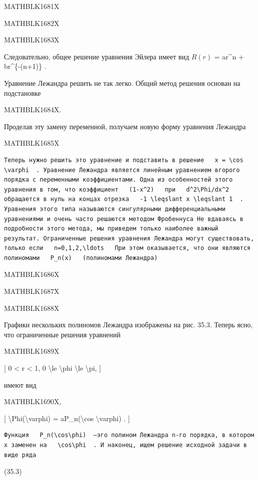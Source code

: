 \documentclass[
]{article}
\begin{document}
{{{MATHBLK1681X

MATHBLK1682X

MATHBLK1683X

Следовательно, общее решение уравнения Эйлера имеет вид \(R(r)\) =
ar\^{}n + br\^{}\{-(n+1)\} .

Уравнение Лежандра решить не так легко. Общий метод решения основан на
подстановке

MATHBLK1684X.

Проделав эту замену переменной, получаем новую форму уравнения Лежандра

MATHBLK1685X

\begin{verbatim}
Теперь нужно решить это уравнение и подставить в решение   x = \cos \varphi  . Уравнение Лежандра является линейным уравнением вгорого порядка с переменными коэффициентами. Одна из особенностей этого уравнения в том, что коэффициент   (1-x^2)   при   d^2\Phi/dx^2   обращается в нуль на концах отрезка   -1 \leqslant x \leqslant 1  . Уравнения этого типа называются сингулярными дифференциальными уравнениями и очень часто решаются методом Фробеннуса Не вдаваясь в подробности этого метода, мы приведем только наиболее важный результат. Ограниченные решения уравнения Лежандра могут существовать, только если   n=0,1,2,\ldots   При этом оказывается, что они являются полиномами   P_n(x)   (полиномами Лежандра)
\end{verbatim}

MATHBLK1686X

MATHBLK1687X

MATHBLK1688X

Графики нескольких полиномов Лежандра изображены на рис. 35.3. Теперь
ясно, что ограниченные решения уравнений

MATHBLK1689X

{[} 0 \textless{} r \textless{} 1, 0 \textbackslash le
\textbackslash phi \textbackslash le \textbackslash pi, {]}

имеют вид

MATHBLK1690X,

{[} \textbackslash Phi(\textbackslash varphi) = aP\_n(\textbackslash cos
\textbackslash varphi) . {]}

\begin{verbatim}
Функция   P_n(\cos\phi)  —эго полином Лежандра n-го порядка, в котором x заменен на   \cos\phi  . И наконец, ищем решение исходной задачи в виде ряда
\end{verbatim}

(35.3)

}}}
\end{document}

